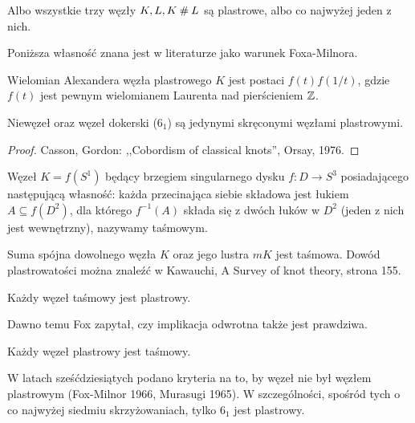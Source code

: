 \begin{proposition}
    Albo wszystkie trzy węzły $K, L, K \mathbin{\#} L$ są plastrowe, albo co najwyżej jeden z nich.
\end{proposition}

Poniższa własność znana jest w literaturze jako warunek Foxa-Milnora.

\begin{proposition}
    Wielomian Alexandera węzła plastrowego $K$ jest postaci $f(t) f(1/t)$, gdzie $f(t)$ jest pewnym wielomianem Laurenta nad pierścieniem $\mathbb Z$.
\end{proposition}

\begin{theorem}
    Niewęzeł oraz węzeł dokerski ($6_1$) są jedynymi skręconymi węzłami plastrowymi.
\end{theorem}

\begin{proof}
    Casson, Gordon: ,,Cobordism of classical knots'', Orsay, 1976.
\end{proof}

\begin{definition}
    Węzeł $K = f(S^1)$ będący brzegiem singularnego dysku $f \colon D \to S^3$ posiadającego następującą własność: każda przecinająca siebie składowa jest łukiem $A \subseteq f(D^2)$, dla którego $f^{-1}(A)$ składa się z dwóch łuków w $D^2$ (jeden z nich jest wewnętrzny), nazywamy taśmowym.
\end{definition}

Suma spójna dowolnego węzła $K$ oraz jego lustra $mK$ jest taśmowa.
Dowód plastrowatości można znaleźć w Kawauchi, A Survey of knot theory, strona 155.

\begin{proposition}
    Każdy węzeł taśmowy jest plastrowy.
\end{proposition}

Dawno temu Fox zapytał, czy implikacja odwrotna także jest prawdziwa.

\begin{conjecture}[Fox, 1958]
    Każdy węzeł plastrowy jest taśmowy.
\end{conjecture}

W latach sześćdziesiątych podano kryteria na to, by węzeł nie był węzłem plastrowym (Fox-Milnor 1966, Murasugi 1965).
W szczególności, spośród tych o co najwyżej siedmiu skrzyżowaniach, tylko $6_1$ jest plastrowy.

